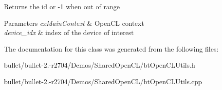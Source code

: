 \begin{DoxyReturn}{Returns}
the id or -\/1 when out of range 
\end{DoxyReturn}

\begin{DoxyParams}{Parameters}
{\em cx\+Main\+Context} & Open\+C\+L context \\
\hline
{\em device\+\_\+idx} & index of the device of interest \\
\hline
\end{DoxyParams}


The documentation for this class was generated from the following files\+:\begin{DoxyCompactItemize}
\item 
bullet/bullet-\/2.-\/r2704/\+Demos/\+Shared\+Open\+C\+L/bt\+Open\+C\+L\+Utils.\+h\item 
bullet/bullet-\/2.-\/r2704/\+Demos/\+Shared\+Open\+C\+L/bt\+Open\+C\+L\+Utils.\+cpp\end{DoxyCompactItemize}
